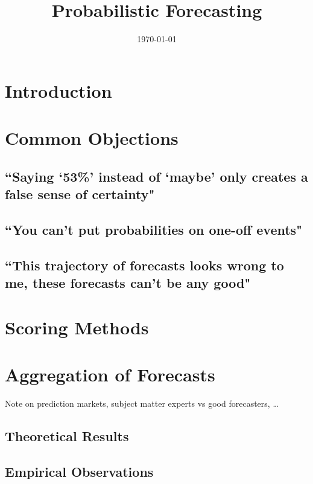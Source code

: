 \documentclass[11pt,reqno]{article}
\numberwithin{equation}{section}
\begin{document}
\title{Probabilistic Forecasting}
\date{\today}

\maketitle


\tableofcontents


\section{Introduction}


\section{Common Objections}

\subsection{``Saying `53\%' instead of `maybe' only creates a false sense of certainty"}
\subsection{``You can't put probabilities on one-off events"}
\subsection{``This trajectory of forecasts looks wrong to me, these forecasts can't be any good"}

\section{Scoring Methods}

\section{Aggregation of Forecasts}
Note on prediction markets, subject matter experts vs good forecasters, \dots

\subsection{Theoretical Results}

\subsection{Empirical Observations}
\end{document}
